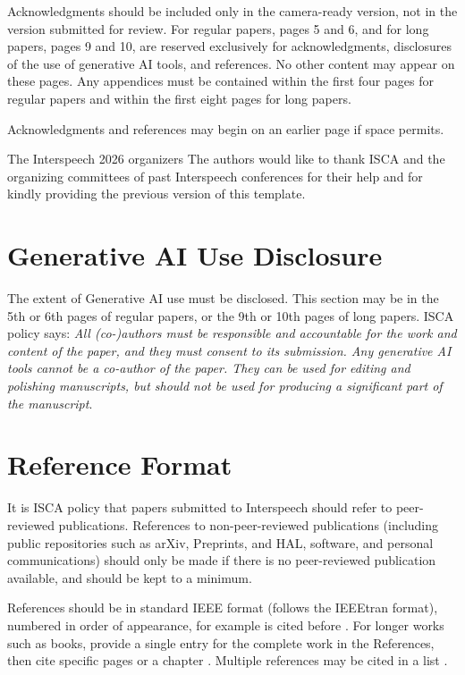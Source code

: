 \documentclass[cameraready]{Interspeech}
\begin{document}
{\color{blue}Acknowledgments should be included only in the camera-ready version, not in the version submitted for review. For regular papers, pages 5 and 6, and for long papers, pages 9 and 10, are reserved exclusively for acknowledgments, disclosures of the use of generative AI tools, and references. No other content may appear on these pages. Any appendices must be contained within the first four pages for regular papers and within the first eight pages for long papers.

Acknowledgments and references may begin on an earlier page if space permits.}

\ifcameraready
     The Interspeech 2026 organizers
\else
     The authors
\fi
would like to thank ISCA and the organizing committees of past Interspeech conferences for their help and for kindly providing the previous version of this template.




{\color{blue}
\section{Generative AI Use Disclosure}
The extent of Generative AI use must be disclosed. This section may be in the 5th or 6th pages of regular papers, or the 9th or 10th pages of long papers.  ISCA policy says: \textit{All (co-)authors must be responsible and accountable for the work and content of the paper, and they must consent to its submission. Any generative AI tools cannot be a co-author of the paper. They can be used for editing and polishing manuscripts, but should not be used for producing a significant part of the manuscript}.}



\section{Reference Format}

{\color{blue}It is ISCA policy that papers submitted to Interspeech should refer to peer-reviewed publications. References to non-peer-reviewed publications (including public repositories such as arXiv, Preprints, and HAL, software, and personal communications) should only be made if there is no peer-reviewed publication available, and should be kept to a minimum.

References should be in standard IEEE format (follows the IEEEtran format), numbered in order of appearance, for example \cite{Davis80-COP} is cited before \cite{Rabiner89-ATO}. For longer works such as books, provide a single entry for the complete work in the References, then cite specific pages \cite[pp.\ 417--422]{Hastie09-TEO} or a chapter \cite[Chapter 2]{Hastie09-TEO}. Multiple references may be cited in a list \cite{Smith22-XXX, Jones22-XXX}.}




\end{document}
